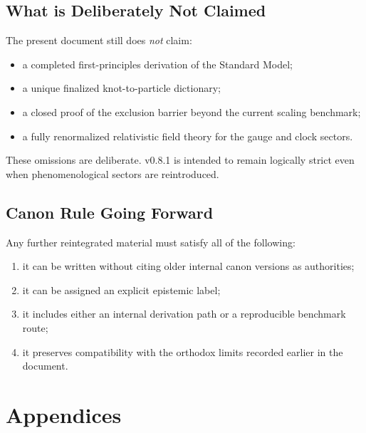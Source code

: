 \documentclass[11pt]{article}
\theoremstyle{definition}
\theoremstyle{plain}
\theoremstyle{remark}
\begin{document}
    \subsection{What is Deliberately Not Claimed}

        The present document still does \emph{not} claim:
        \begin{itemize}
            \item a completed first-principles derivation of the Standard Model;
            \item a unique finalized knot-to-particle dictionary;
            \item a closed proof of the exclusion barrier beyond the current scaling benchmark;
            \item a fully renormalized relativistic field theory for the gauge and clock sectors.
        \end{itemize}

        These omissions are deliberate. v0.8.1 is intended to remain logically strict even when phenomenological
        sectors are reintroduced.

    \subsection{Canon Rule Going Forward}

        Any further reintegrated material must satisfy all of the following:
        \begin{enumerate}
            \item it can be written without citing older internal canon versions as authorities;
            \item it can be assigned an explicit epistemic label;
            \item it includes either an internal derivation path or a reproducible benchmark route;
            \item it preserves compatibility with the orthodox limits recorded earlier in the document.
        \end{enumerate}

\newpage
\section*{Appendices}
    \appendix
\end{document}
